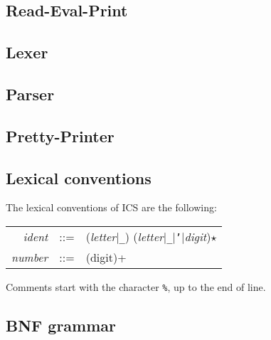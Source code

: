 \documentclass[12pt]{article}
\begin{document}
  
  

  \subsection{Read-Eval-Print}\label{subsec:repl}

  

  \subsection{Lexer}\label{subsec:lexer}
 
  

  \subsection{Parser}\label{subsec:parser}
 
  

  \subsection{Pretty-Printer}\label{subsec:pretty}

  

  


  \subsection{Lexical conventions}

  The lexical conventions of ICS are the following:
  \begin{center}
   \begin{tabular}{rrl}
    \textit{ident} & ::= & (\textit{letter}$|$\texttt{\_}) 
                           (\textit{letter}$|$\texttt{\_}$|$\texttt{'}$|$\textit{digit})$\star$
                           \\
    \textit{number} & ::= & (digit)+
  \end{tabular}
  \end{center}
  Comments start with the character \texttt{\%}, up to the end of line.

  \subsection{BNF grammar}
\end{document}
